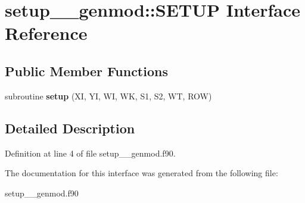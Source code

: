 \hypertarget{interfacesetup____genmod_1_1_s_e_t_u_p}{\section{setup\+\_\+\+\_\+genmod\+:\+:S\+E\+T\+U\+P Interface Reference}
\label{interfacesetup____genmod_1_1_s_e_t_u_p}
}
\subsection*{Public Member Functions}
\begin{DoxyCompactItemize}
\item 
\hypertarget{interfacesetup____genmod_1_1_s_e_t_u_p_a6beaec8b85b43bb3002b87e326aa5e15}{subroutine {\bfseries setup} (X\+I, Y\+I, W\+I, W\+K, S1, S2, W\+T, R\+O\+W)}\label{interfacesetup____genmod_1_1_s_e_t_u_p_a6beaec8b85b43bb3002b87e326aa5e15}

\end{DoxyCompactItemize}


\subsection{Detailed Description}


Definition at line 4 of file setup\+\_\+\+\_\+genmod.\+f90.



The documentation for this interface was generated from the following file\+:\begin{DoxyCompactItemize}
\item 
setup\+\_\+\+\_\+genmod.\+f90\end{DoxyCompactItemize}
